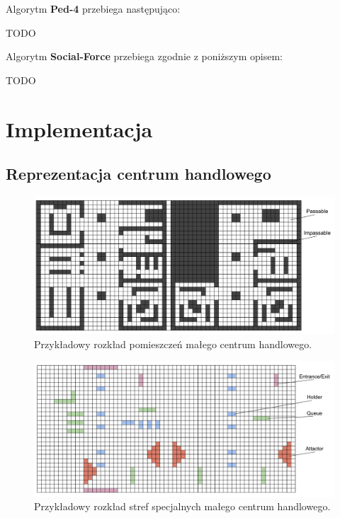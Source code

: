 \documentclass[a4paper, 12pt]{article}
\begin{document}
\noindent
Algorytm \textbf{Ped-4} przebiega następująco:

TODO

\noindent
Algorytm \textbf{Social-Force} przebiega zgodnie z poniższym opisem:

TODO

\newpage
    \section{Implementacja}
    \label{sec:implementation}


        \subsection{Reprezentacja centrum handlowego}
        \label{sec:mall-impl}

        \begin{figure}[H]
            \centering
            \includegraphics[scale=0.2]{./img/MallLayout.pdf}
            \caption{Przykładowy rozkład pomieszczeń małego centrum handlowego.}
            \label{fig:mall-layout}
        \end{figure}

        \begin{figure}[H]
            \centering
            \includegraphics[scale=0.2]{./img/MallFeatures.pdf}
            \caption{Przykładowy rozkład stref specjalnych małego centrum handlowego.}
            \label{fig:mall-features}
        \end{figure}
\end{document}
